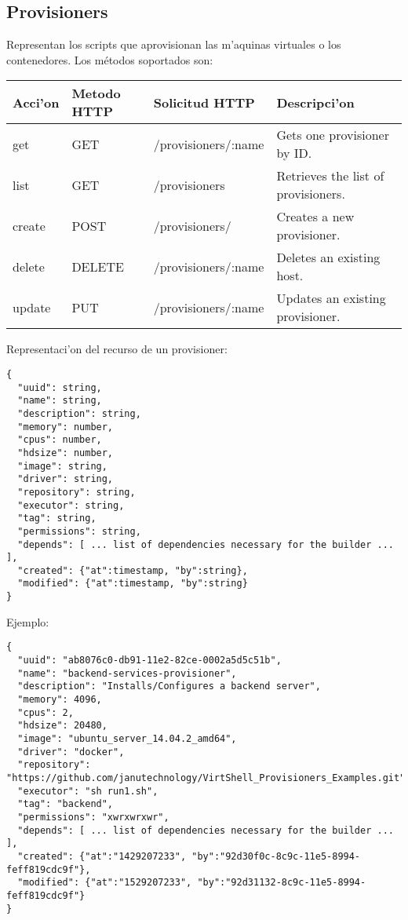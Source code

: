 \subsection{Provisioners}
Representan los scripts que aprovisionan las m'aquinas virtuales o los contenedores. Los métodos soportados son:

\begin{center}
 \begin{tabular}{| l | l | l | l |}
 \hline
  \rowcolor{blueapi}
  \textbf{Acci'on} & \textbf{Metodo HTTP} & \textbf{Solicitud HTTP} & \textbf{Descripci'on} \\ [0.5ex] 
  \hline\hline
  get & GET & /provisioners/:name & Gets one provisioner by ID. \\
  \hline
  list & GET & /provisioners & Retrieves the list of provisioners. \\
  \hline  
  create & POST & /provisioners/ & Creates a new provisioner. \\
  \hline
  delete & DELETE & /provisioners/:name & Deletes an existing host. \\
  \hline  
  update & PUT & /provisioners/:name & Updates an existing provisioner. \\ [1ex] 
  \hline
\end{tabular}
\end{center}

Representaci'on del recurso de un provisioner:

\medskip
\begin{lstlisting}[style=json]
{
  "uuid": string,
  "name": string,
  "description": string,
  "memory": number,
  "cpus": number,
  "hdsize": number,
  "image": string,
  "driver": string,
  "repository": string,
  "executor": string,
  "tag": string,
  "permissions": string,
  "depends": [ ... list of dependencies necessary for the builder ... ],
  "created": {"at":timestamp, "by":string},
  "modified": {"at":timestamp, "by":string}
}

\end{lstlisting}

Ejemplo:

\medskip
\begin{lstlisting}[style=json]
{
  "uuid": "ab8076c0-db91-11e2-82ce-0002a5d5c51b",
  "name": "backend-services-provisioner",
  "description": "Installs/Configures a backend server",
  "memory": 4096,
  "cpus": 2,
  "hdsize": 20480,
  "image": "ubuntu_server_14.04.2_amd64",
  "driver": "docker",
  "repository": "https://github.com/janutechnology/VirtShell_Provisioners_Examples.git",
  "executor": "sh run1.sh",
  "tag": "backend",
  "permissions": "xwrxwrxwr",
  "depends": [ ... list of dependencies necessary for the builder ... ],
  "created": {"at":"1429207233", "by":"92d30f0c-8c9c-11e5-8994-feff819cdc9f"},
  "modified": {"at":"1529207233", "by":"92d31132-8c9c-11e5-8994-feff819cdc9f"}
}
\end{lstlisting}

